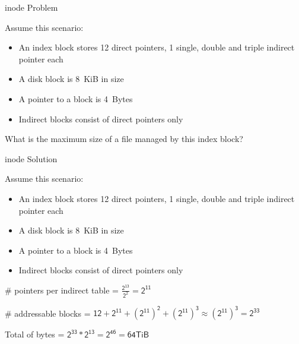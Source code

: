   \begin{frame}{inode Problem}
    
    Assume this scenario:
    \begin{itemize}
      \item An index block stores 12 direct pointers, 1 single, double and
            triple indirect pointer each
      \item A disk block is 8~KiB in size
      \item A pointer to a block is 4~Bytes
      \item Indirect blocks consist of direct pointers only
    \end{itemize}

    \vspace{2em}

    What is the maximum size of a file managed by this index block?
  \end{frame}

  \begin{frame}{inode Solution}
    
    Assume this scenario:
    \begin{itemize}
      \item An index block stores 12 direct pointers, 1 single, double and triple indirect pointer each
      \item A disk block is 8~KiB in size
      \item A pointer to a block is 4~Bytes
      \item Indirect blocks consist of direct pointers only
    \end{itemize}

    \vspace{2em}

    \# pointers per indirect table = $\mathsf{\frac{2^{13}}{2^2} = 2^{11}}$

    \# addressable blocks = $\mathsf{12 + 2^{11} + (2^{11})^2 + (2^{11})^3 \approx (2^{11})^3 = 2^{33}}$

    Total of bytes = $\mathsf{2^{33} * 2^{13} = 2^{46} = 64 TiB}$
  \end{frame}

